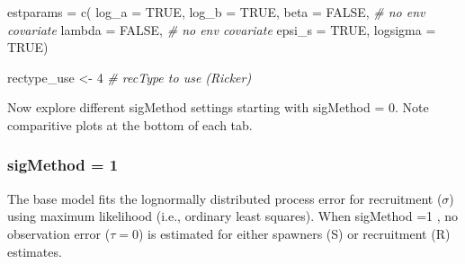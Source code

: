 \documentclass[
]{article}
\newenvironment{Shaded}{\begin{snugshade}}{\end{snugshade}}
\newcommand{\AttributeTok}[1]{\textcolor[rgb]{0.77,0.63,0.00}{#1}}
\newcommand{\CommentTok}[1]{\textcolor[rgb]{0.56,0.35,0.01}{\textit{#1}}}
\newcommand{\ConstantTok}[1]{\textcolor[rgb]{0.00,0.00,0.00}{#1}}
\newcommand{\DecValTok}[1]{\textcolor[rgb]{0.00,0.00,0.81}{#1}}
\newcommand{\FunctionTok}[1]{\textcolor[rgb]{0.00,0.00,0.00}{#1}}
\newcommand{\NormalTok}[1]{#1}
\newcommand{\OtherTok}[1]{\textcolor[rgb]{0.56,0.35,0.01}{#1}}
\begin{document}
\begin{Shaded}
\begin{Highlighting}[]
\NormalTok{   estparams  }\OtherTok{=} \FunctionTok{c}\NormalTok{(}
    \AttributeTok{log\_a        =} \ConstantTok{TRUE}\NormalTok{,}
    \AttributeTok{log\_b        =} \ConstantTok{TRUE}\NormalTok{,}
    \AttributeTok{beta         =} \ConstantTok{FALSE}\NormalTok{,  }\CommentTok{\# no env covariate}
    \AttributeTok{lambda       =} \ConstantTok{FALSE}\NormalTok{,  }\CommentTok{\# no env covariate}
    \AttributeTok{epsi\_s       =} \ConstantTok{TRUE}\NormalTok{,}
    \AttributeTok{logsigma     =} \ConstantTok{TRUE}\NormalTok{)}

\NormalTok{   rectype\_use }\OtherTok{\textless{}{-}} \DecValTok{4} \CommentTok{\# recType to use (Ricker)}
\end{Highlighting}
\end{Shaded}

Now explore different sigMethod settings starting with sigMethod = 0.
Note comparitive plots at the bottom of each tab.

\hypertarget{sigmethod-1-1}{%
\subsubsection{sigMethod = 1}\label{sigmethod-1-1}}

The base model fits the lognormally distributed process error for
recruitment (\(\sigma\)) using maximum likelihood (i.e., ordinary least
squares). When sigMethod =1 , no observation error (\(\tau = 0\)) is
estimated for either spawners (S) or recruitment (R) estimates.
\end{document}
